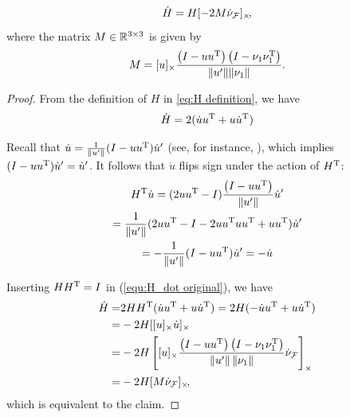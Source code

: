 \documentclass[10pt,twocolumn,twoside]{IEEEtran}
\begin{document}
{\begin{proposition}
  \begin{equation}
    \dot{H}=H[-2M\dot{\nu}_{\mathcal{F}}]_{\times}\!,
  \end{equation}
  where the matrix $M\in\mathbb{R}^{3\times3}{}$ is given by
  \begin{equation}
    M=[u]_{\times}  \frac{ \left( I - u u^\mathrm{T} \right) \left( I- \nu_1 \nu_1^\mathrm{T} \right)} {\lVert u'\rVert \lVert\nu_1\rVert}.
  \end{equation}
\end{proposition}
\begin{proof}
    From the definition of $H$ in \eqref{eq:H definition}, we have
    \begin{equation} \label{equ:H_dot original}
      \dot H =   2(\dot u u^\mathrm{T} + u \dot u^\mathrm{T})
    \end{equation}

    Recall that $\dot{u}=\frac{1}{\lVert u'\rVert}(I-uu^\mathrm{T})\dot{u}'$ (see, for instance, \cite{Tron:Arxiv14}), which implies $(I-uu^\mathrm{T})\dot{u}'=\dot{u}'$. It follows that $\dot{u}$ flips sign under the action of $H^\mathrm{T}$:
    \begin{multline}
      H^\mathrm{T} \dot u = (2u u^\mathrm{T}-I)\frac{ \left( I - u u^\mathrm{T} \right) } {\left\|u'\right\|} \dot u' \\
      =\frac{1}{\lVert u'\rVert} (2u u^\mathrm{T}-I-2u u^\mathrm{T} u u^\mathrm{T}+u u^\mathrm{T})\dot{u}'\\
      = -\frac{1}{\lVert u'\rVert} (I-u u^\mathrm{T})\dot u'
      = -\dot u
    \end{multline}

    Inserting $HH^\mathrm{T}=I$ in (\ref{equ:H_dot original}), we have
    \begin{equation}
      \begin{split}
        \dot H =  &  2H H^\mathrm{T}(\dot u u^\mathrm{T} + u \dot u^\mathrm{T})
        =  2 H (-\dot u u^\mathrm{T} + u \dot u^\mathrm{T})\\
        =  &  -2H [[u]_{\times} \dot u]_{\times} \\
        = &  -2 H \left[ [u]_{\times}  \frac{ \left( I - u u^\mathrm{T} \right) \left( I- \nu_1 \nu_1^\mathrm{T} \right)} {\left\|u'\right\| \left\|\nu_1\right\|} \dot{\nu}_{\mathcal{F}}\right]_{\times}\\
        = & -2 H [M \dot{\nu}_{\mathcal{F}}]_{\times}\!,
      \end{split}
    \end{equation}
    which is equivalent to the claim.
  \end{proof}
}
\end{document}
